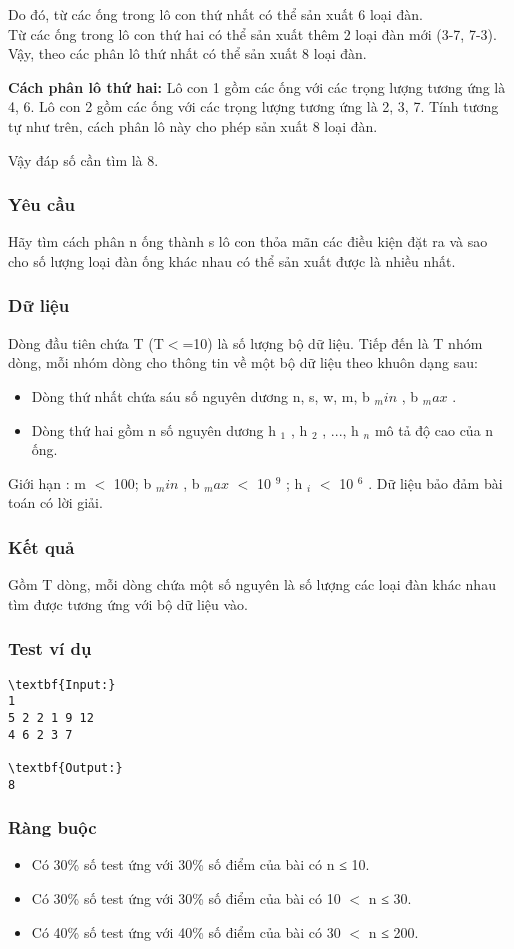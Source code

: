 Do đó, từ các ống trong lô con thứ nhất có thể sản xuất 6 loại đàn.
\\Từ các ống trong lô con thứ hai có thể sản xuất thêm 2 loại đàn mới (3-7, 7-3).
\\Vậy, theo các phân lô thứ nhất có thể sản xuất 8 loại đàn.

\textbf{Cách phân lô thứ hai: } Lô con 1 gồm các ống với các trọng lượng tương ứng là 4, 6. Lô con 2 gồm các ống với các trọng lượng tương ứng là 2, 3, 7. Tính tương tự như trên, cách phân lô này cho phép sản xuất 8 loại đàn.

Vậy đáp số cần tìm là 8.

\subsubsection{Yêu cầu}

Hãy tìm cách phân n ống thành s lô con thỏa mãn các điều kiện đặt ra và sao cho số lượng loại đàn ống khác nhau có thể sản xuất được là nhiều nhất.

\subsubsection{Dữ liệu}

Dòng đầu tiên chứa T (T$<$=10) là số lượng bộ dữ liệu. Tiếp đến là T nhóm dòng, mỗi nhóm dòng cho thông tin về một bộ dữ liệu theo khuôn dạng sau:
\begin{itemize}
	\item Dòng thứ nhất chứa sáu số nguyên dương n, s, w, m, b $_ min $ , b $_ max $ .
	\item Dòng thứ hai gồm n số nguyên dương h $_ 1 $ , h $_ 2 $ , ..., h $_ n $ mô tả độ cao của n ống.
\end{itemize}

Giới hạn : m $<$ 100; b $_ min $ , b $_ max $ $<$ 10 $^ 9 $ ; h $_ i $ $<$ 10 $^ 6 $ . Dữ liệu bảo đảm bài toán có lời giải.
\begin{itemize}
\end{itemize}

\subsubsection{Kết quả}

Gồm T dòng, mỗi dòng chứa một số nguyên là số lượng các loại đàn khác nhau tìm được tương ứng với bộ dữ liệu vào.

\subsubsection{Test ví dụ}
\begin{verbatim}
\textbf{Input:}
1
5 2 2 1 9 12
4 6 2 3 7

\textbf{Output:}
8\end{verbatim}

\subsubsection{Ràng buộc}
\begin{itemize}
	\item Có 30\% số test ứng với 30\% số điểm của bài có n ≤ 10.
	\item Có 30\% số test ứng với 30\% số điểm của bài có 10 $<$ n ≤ 30.
	\item Có 40\% số test ứng với 40\% số điểm của bài có 30 $<$ n ≤ 200.
\end{itemize}